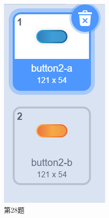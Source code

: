 \documentclass[10pt, a4paper]{article}
\begin{document}
\begin{figure}[htbp]
\begin{minipage}[t]{.33\textwidth}
\begin{minipage}[t]{.33\textwidth}
                \includegraphics[width=\textwidth]{28-1.png}
            \end{minipage}
            \caption*{第28题}
        \end{minipage}
    \end{figure}
\end{document}
